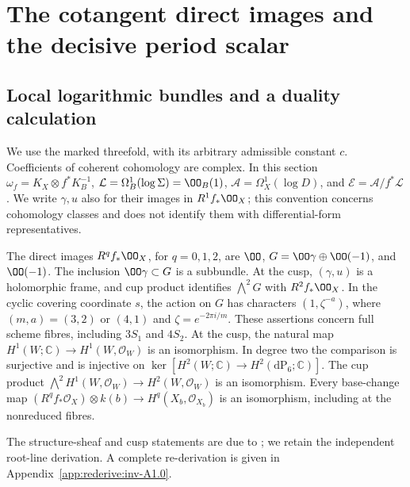 \section{The cotangent direct images and the decisive period scalar}
\label{inv:sec:partA}

\subsection{Local logarithmic bundles and a duality calculation}

We use the marked threefold, with its arbitrary admissible
constant $c$.  Coefficients of coherent cohomology are complex.  In this
section $\omega_f=K_X\otimes f^*K_B^{-1}$,
$\mathcal L=\Omega_B^1(\log\Sigma)=\OO_B(1)$,
$\mathcal A=\Omega_X^1(\log D)$, and
$\mathcal E=\mathcal A/f^*\mathcal L$.  We write $\gamma,u$ also for
their images in $R^1f_*\OO_X$; this convention concerns cohomology
classes and does not identify them with differential-form representatives.

\begin{proposition}\label{inv:A1.0}\label{wb:thm:structure-direct-images-audit}\label{wb:lem:cusp-structure-sheaf-audit}
The direct images $R^qf_*\OO_X$, for $q=0,1,2$, are
$\OO$, $G=\OO\gamma\oplus\OO(-1)$, and $\OO(-1)$.
The inclusion $\OO\gamma\subset G$ is a subbundle.  At the cusp,
$(\gamma,u)$ is a holomorphic frame, and cup product identifies
$\bigwedge^2G$ with $R^2f_*\OO_X$.  In the cyclic covering coordinate
$s$, the action on $G$ has characters $(1,\zeta^{-a})$, where
$(m,a)=(3,2)$ or $(4,1)$ and $\zeta=e^{-2\pi i/m}$.
These assertions concern full scheme fibres, including $3S_1$ and $4S_2$.
At the cusp, the natural map $H^1(W;\mathbb C)\to H^1(W,\mathcal O_W)$ is an isomorphism. In degree two the comparison is surjective and is injective on $\ker[H^2(W;\mathbb C)\to H^2(\mathrm{dP}_6;\mathbb C)]$. The cup product $\bigwedge^2H^1(W,\mathcal O_W)\to H^2(W,\mathcal O_W)$ is an isomorphism. Every base-change map $(R^qf_*\mathcal O_X)\otimes k(b)\to H^q(X_b,\mathcal O_{X_b})$ is an isomorphism, including at the nonreduced fibres.
\end{proposition}


The structure-sheaf and cusp statements are due to \citet[Lemma~9.12 and Proposition~9.13]{AC2026}; we retain the independent root-line derivation. A complete re-derivation is given in Appendix~\ref{app:rederive:inv-A1.0}.


